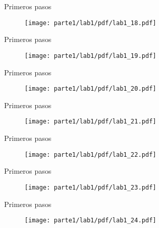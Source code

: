 \begin{frame}{Primeros pasos }
\begin{figure}[H]
\centering
\texttt{[image: parte1/lab1/pdf/lab1\_18.pdf]}
\end{figure}
\end{frame}

\begin{frame}{Primeros pasos }
\begin{figure}[H]
\centering
\texttt{[image: parte1/lab1/pdf/lab1\_19.pdf]}
\end{figure}
\end{frame}

\begin{frame}{Primeros pasos }
\begin{figure}[H]
\centering
\texttt{[image: parte1/lab1/pdf/lab1\_20.pdf]}
\end{figure}
\end{frame}

\begin{frame}{Primeros pasos }
\begin{figure}[H]
\centering
\texttt{[image: parte1/lab1/pdf/lab1\_21.pdf]}
\end{figure}
\end{frame}

\begin{frame}{Primeros pasos }
\begin{figure}[H]
\centering
\texttt{[image: parte1/lab1/pdf/lab1\_22.pdf]}
\end{figure}
\end{frame}

\begin{frame}{Primeros pasos }
\begin{figure}[H]
\centering
\texttt{[image: parte1/lab1/pdf/lab1\_23.pdf]}
\end{figure}
\end{frame}

\begin{frame}{Primeros pasos }
\begin{figure}[H]
\centering
\texttt{[image: parte1/lab1/pdf/lab1\_24.pdf]}
\end{figure}
\end{frame}

